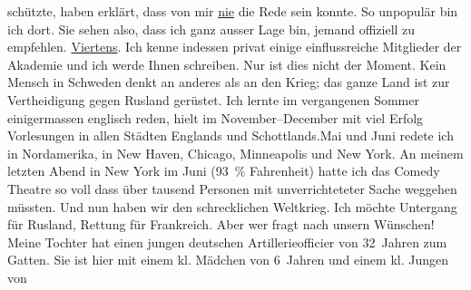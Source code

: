 \begin{ledgroupsized}[t]{13cm}
                    schützte, haben erklärt, dass von mir \uline{nie} die
                    Rede sein konnte. So unpopulär bin ich dort. Sie sehen also, dass ich ganz
                    ausser Lage bin, jemand offiziell zu empfehlen.\pend
           \pstart
           \uline{Viertens}. Ich kenne indessen privat einige
                    einflussreiche Mitglieder der Akademie und ich werde Ihnen schreiben.\pend
           \pstart
           Nur ist dies nicht der Moment. Kein Mensch in Schweden denkt an anderes als an den Krieg; das ganze Land ist zur
                    Vertheidigung gegen Rusland gerüstet.\pend
           \pstart
           {\pb}Ich lernte im vergangenen
                    Sommer einigermassen englisch reden, hielt im
                        November–December mit viel Erfolg Vorlesungen in
                    allen Städten Englands und Schottlands.\hspace*{2em}Mai und Juni redete ich in Nordamerika, in New Haven, Chicago, Minneapolis und New York. An meinem
                    letzten Abend in New York im
                        Juni (93 {\%} Fahrenheit) hatte ich das
                        Comedy Theatre so voll dass über tausend
                    Personen mit unverrichteteter Sache weggehen müssten.\pend
           \pstart
           Und nun haben wir den schrecklichen Weltkrieg. Ich möchte Untergang für Rusland, Rettung für Frankreich. Aber wer fragt nach unsern Wünschen! Meine Tochter hat einen jungen
                    deutschen Artillerieofficier von 32 Jahren zum Gatten. Sie ist hier mit einem
                    kl. Mädchen von 6 Jahren
                    und einem kl. Jungen von

\end{ledgroupsized}
